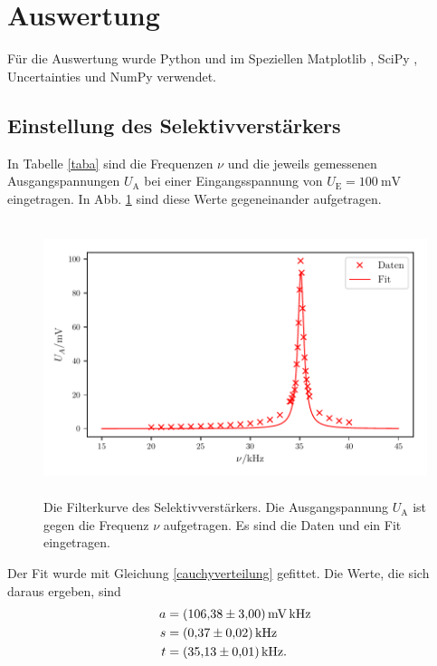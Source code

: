 \section{Auswertung}
\label{sec:Auswertung}

Für die Auswertung wurde Python und im Speziellen Matplotlib \cite{matplotlib}, SciPy \cite{scipy},
Uncertainties \cite{uncertainties} und NumPy \cite{numpy} verwendet.

\subsection{Einstellung des Selektivverstärkers}
In Tabelle \ref{taba} sind die Frequenzen $\nu$ und die jeweils gemessenen Ausgangspannungen $U_\text{A}$ 
bei einer Eingangsspannung von $U_\text{E} = \SI{100}{\milli\volt}$ eingetragen. 
In Abb. \ref{plota} sind diese Werte gegeneinander aufgetragen.



\begin{figure}
    \centering
    \includegraphics[width=15cm, height=8cm]{build/plota2.pdf} %
    \caption{Die Filterkurve des Selektivverstärkers. Die Ausgangspannung $U_\text{A}$
    ist gegen die Frequenz $\nu$ aufgetragen. Es sind die Daten und ein Fit eingetragen.}
    \label{plota}
\end{figure}

\noindent Der Fit wurde mit Gleichung \eqref{cauchyverteilung} gefittet. Die Werte, die sich daraus ergeben, sind
\begin{align*} 
  a &= \SI{106.38 \pm 3}{\milli\volt\kilo\hertz} \\
  s &= \SI{0.37(2)}{\kilo\hertz} \\
  t &= \SI{35.13(1)}{\kilo\hertz}. 
\end{align*}



